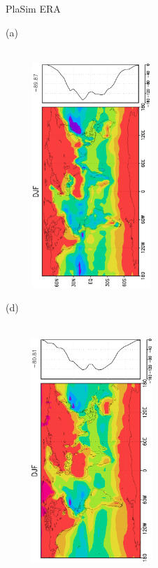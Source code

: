 \documentclass[12pt,a4paper,twoside,openright,headinclude,liststotoc,bibtotoc]{scrreprt}
\begin{document}
\begin{appendix}
\begin{figure}[c]
\hspace{3.1cm}PlaSim \vspace{0.2cm} \hspace{7.1cm} ERA \\
\parbox{8.5cm}{\hspace{0.50cm}\begin{scriptsize} (a)\end{scriptsize} \vspace{-0.5cm} \\
\includegraphics[height=8.5cm,width=6.5cm,angle=-90]
{eps/zonalysmslhflu147DJF.eps}
}
\parbox{8.5cm}{\hspace{0.25cm}\begin{scriptsize} (d)\end{scriptsize} \vspace{-0.5cm} \\
\includegraphics[height=8.5cm,width=6.5cm,angle=-90]
{eps/zonalt21ysmslhfl147DJFfinal.eps}
}
\end{figure}
\end{appendix}
\end{document}
